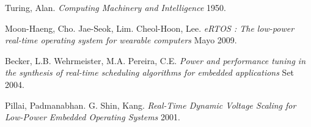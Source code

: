 \documentclass[conference]{IEEEtran}
\begin{document}
\begin{thebibliography}{0}
    
    Turing, Alan.
    \textsl{Computing Machinery and Intelligence}   
    1950.
    
    Moon-Haeng, Cho. Jae-Seok, Lim. Cheol-Hoon, Lee.
    \textsl{eRTOS : The low-power real-time operating system for wearable computers}   
    Mayo 2009.
    
    Becker, L.B. Wehrmeister, M.A. Pereira, C.E.
    \textsl{Power and performance tuning in the synthesis of real-time scheduling algorithms for embedded applications}   
    Set 2004.
    
    Pillai, Padmanabhan. G. Shin, Kang.
    \textsl{Real-Time Dynamic Voltage Scaling for Low-Power Embedded Operating Systems}   
    2001.

    
\end{thebibliography} 
\end{document}
